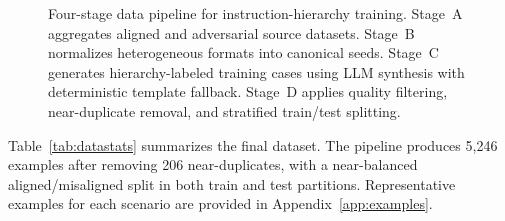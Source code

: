 \documentclass[sigconf]{acmart}
\begin{document}
\begin{figure}[t]
\centering
{}
\caption{Four-stage data pipeline for instruction-hierarchy training. Stage~A aggregates aligned and adversarial source datasets. Stage~B normalizes heterogeneous formats into canonical seeds. Stage~C generates hierarchy-labeled training cases using LLM synthesis with deterministic template fallback. Stage~D applies quality filtering, near-duplicate removal, and stratified train/test splitting.}
\label{fig:pipeline}
\end{figure}

Table~\ref{tab:datastats} summarizes the final dataset. The pipeline produces 5,246 examples after removing 206 near-duplicates, with a near-balanced aligned/misaligned split in both train and test partitions. Representative examples for each scenario are provided in Appendix~\ref{app:examples}.
\end{document}
